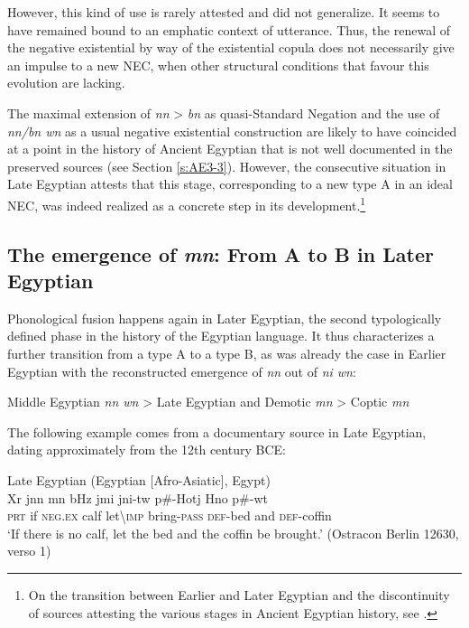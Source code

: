 \documentclass[output=paper]{langsci/langscibook}
\begin{document}
However, this kind of use is rarely attested and did not generalize. It seems to have remained bound to an emphatic context of utterance. Thus, the renewal of the negative existential by way of the existential copula does not necessarily give an impulse to a new NEC, when other structural conditions that favour this evolution are lacking.  
 
The maximal extension of \textit{nn} > \textit{bn} as quasi-Standard Negation and the use of \textit{nn/bn wn} as a usual negative existential construction are likely to have coincided at a point in the history of Ancient Egyptian that is not well documented in the preserved sources (see Section \ref{s:AE3-3}). However, the consecutive situation in Late Egyptian attests that this stage, corresponding to a new type A in an ideal NEC, was indeed realized as a concrete step in its development.\footnote{On the transition between Earlier and Later Egyptian and the discontinuity of sources attesting the various stages in Ancient Egyptian history, see \citet{Zoller-Engelhardt2016}.}  

\subsection{The emergence of \textit{mn}: From A to B in Later Egyptian}\label{s:AE2-6}

Phonological fusion happens again in Later Egyptian, the second typologically defined phase in the history of the Egyptian language. It thus characterizes a further transition from a type A to a type B, as was already the case in Earlier Egyptian with the reconstructed emergence of \textit{nn} out of \textit{ni wn}:  
 
Middle Egyptian \textit{nn wn} > Late Egyptian and Demotic \textit{mn} > Coptic \textit{mn} 
 
The following example comes from a documentary source in Late Egyptian, dating approximately from the 12th century BCE: 
 
\ea Late Egyptian (Egyptian [Afro-Asiatic], Egypt) \label{ex:AE44}\\
    \gll Xr jnn mn bHz jmi jni-tw p\#-Hotj Hno p\#-wt \\
    \textsc{prt} if \textsc{neg.ex} calf let\textbackslash\textsc{imp} bring-\textsc{pass} \textsc{def}-bed and \textsc{def}-coffin\\ 
    \glt ‘If there is no calf, let the bed and the coffin be brought.’ (Ostracon Berlin 12630, verso 1) 
\z 
\end{document}
